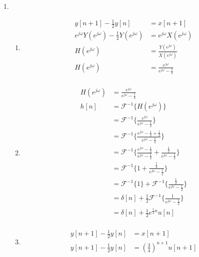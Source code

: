 \documentclass[10pt,a4paper, margin=1in]{article}
\begin{document}
\begin{enumerate}
\item %
	\begin{enumerate}
    \item %
    \begin{align*}
        y[n + 1] - \frac{1}{2}y[n] &= x[n + 1] \\ 
        e^{j\omega}Y(e^{j\omega}) - \frac{1}{2}Y(e^{j\omega}) &= e^{j\omega}X(e^{j\omega}) \\
        H(e^{j\omega}) &= \frac{Y(e^{j\omega})}{X(e^{j\omega})} \\
        H(e^{j\omega}) &= \frac{e^{j\omega}}{e^{j\omega} - \frac{1}{2}} \\
    \end{align*}
    \item %
    \begin{align*}
        H(e^{j\omega}) &= \frac{e^{j\omega}}{e^{j\omega} - \frac{1}{2}} \\
        h[n] &= \mathcal{F}^{-1}\{H(e^{j\omega})\} \\
        &= \mathcal{F}^{-1}\{\frac{e^{j\omega}}{e^{j\omega} - \frac{1}{2}}\} \\
        &= \mathcal{F}^{-1}\{\frac{e^{j\omega} - \frac{1}{2} + \frac{1}{2}}{e^{j\omega} - \frac{1}{2}}\} \\
        &= \mathcal{F}^{-1}\{\frac{e^{j\omega} - \frac{1}{2}}{e^{j\omega} - \frac{1}{2}} + \frac{\frac{1}{2}}{e^{j\omega} - \frac{1}{2}}\} \\
        &= \mathcal{F}^{-1}\{1 + \frac{\frac{1}{2}}{e^{j\omega} - \frac{1}{2}}\} \\
        &= \mathcal{F}^{-1}\{1\} + \mathcal{F}^{-1}\{\frac{\frac{1}{2}}{e^{j\omega} - \frac{1}{2}}\} \\
        &= \delta[n] + \frac{1}{2}\mathcal{F}^{-1}\{\frac{1}{e^{j\omega} - \frac{1}{2}}\} \\
        &= \delta[n] + \frac{1}{2}e^{\frac{1}{2}n}u[n] \\
    \end{align*}
	\item %
    \begin{align*}
        y[n + 1] - \frac{1}{2}y[n] &= x[n + 1] \\ 
        y[n + 1] - \frac{1}{2}y[n] &= \left(\frac{3}{4}\right)^{n + 1}u[n + 1] \\ 

\end{align*}
\end{enumerate}
\end{enumerate}
\end{document}
